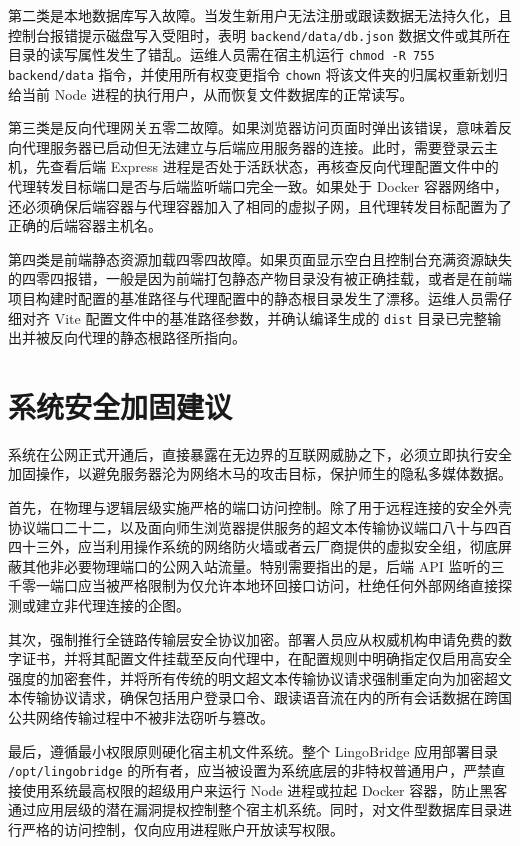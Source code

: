 第二类是本地数据库写入故障。当发生新用户无法注册或跟读数据无法持久化，且控制台报错提示磁盘写入受阻时，表明 \texttt{backend/data/db.json} 数据文件或其所在目录的读写属性发生了错乱。运维人员需在宿主机运行 \texttt{chmod -R 755 backend/data} 指令，并使用所有权变更指令 \texttt{chown} 将该文件夹的归属权重新划归给当前 Node 进程的执行用户，从而恢复文件数据库的正常读写。

第三类是反向代理网关五零二故障。如果浏览器访问页面时弹出该错误，意味着反向代理服务器已启动但无法建立与后端应用服务器的连接。此时，需要登录云主机，先查看后端 Express 进程是否处于活跃状态，再核查反向代理配置文件中的代理转发目标端口是否与后端监听端口完全一致。如果处于 Docker 容器网络中，还必须确保后端容器与代理容器加入了相同的虚拟子网，且代理转发目标配置为了正确的后端容器主机名。

第四类是前端静态资源加载四零四故障。如果页面显示空白且控制台充满资源缺失的四零四报错，一般是因为前端打包静态产物目录没有被正确挂载，或者是在前端项目构建时配置的基准路径与代理配置中的静态根目录发生了漂移。运维人员需仔细对齐 Vite 配置文件中的基准路径参数，并确认编译生成的 \texttt{dist} 目录已完整输出并被反向代理的静态根路径所指向。

\section{系统安全加固建议}

系统在公网正式开通后，直接暴露在无边界的互联网威胁之下，必须立即执行安全加固操作，以避免服务器沦为网络木马的攻击目标，保护师生的隐私多媒体数据。

首先，在物理与逻辑层级实施严格的端口访问控制。除了用于远程连接的安全外壳协议端口二十二，以及面向师生浏览器提供服务的超文本传输协议端口八十与四百四十三外，应当利用操作系统的网络防火墙或者云厂商提供的虚拟安全组，彻底屏蔽其他非必要物理端口的公网入站流量。特别需要指出的是，后端 API 监听的三千零一端口应当被严格限制为仅允许本地环回接口访问，杜绝任何外部网络直接探测或建立非代理连接的企图。

其次，强制推行全链路传输层安全协议加密。部署人员应从权威机构申请免费的数字证书，并将其配置文件挂载至反向代理中，在配置规则中明确指定仅启用高安全强度的加密套件，并将所有传统的明文超文本传输协议请求强制重定向为加密超文本传输协议请求，确保包括用户登录口令、跟读语音流在内的所有会话数据在跨国公共网络传输过程中不被非法窃听与篡改。

最后，遵循最小权限原则硬化宿主机文件系统。整个 LingoBridge 应用部署目录 \texttt{/opt/lingobridge} 的所有者，应当被设置为系统底层的非特权普通用户，严禁直接使用系统最高权限的超级用户来运行 Node 进程或拉起 Docker 容器，防止黑客通过应用层级的潜在漏洞提权控制整个宿主机系统。同时，对文件型数据库目录进行严格的访问控制，仅向应用进程账户开放读写权限。

